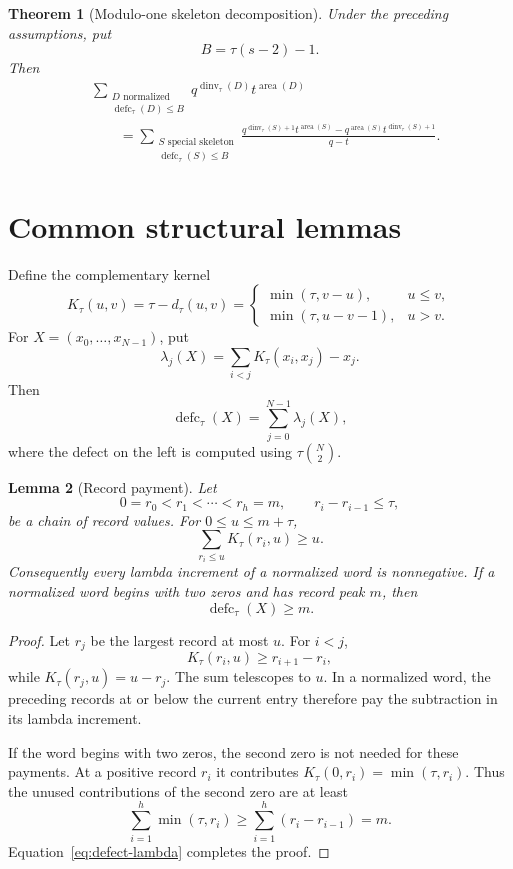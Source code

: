 \documentclass[11pt]{article}
\newtheorem{theorem}{Theorem}[section]
\newtheorem{lemma}[theorem]{Lemma}
\theoremstyle{definition}
\theoremstyle{remark}
\newcommand{\area}{\operatorname{area}}
\newcommand{\dinv}{\operatorname{dinv}}
\newcommand{\defc}{\operatorname{defc}}
\begin{document}
\begin{theorem}[Modulo-one skeleton decomposition]
\label{thm:main}
Under the preceding assumptions, put
\[
  B=\tau(s-2)-1.
\]
Then
\begin{align*}
 &\sum_{\substack{D\text{ normalized}\\\defc_\tau(D)\le B}}
 q^{\dinv_\tau(D)}t^{\area(D)}\\
 &\qquad=
 \sum_{\substack{S\text{ special skeleton}\\\defc_\tau(S)\le B}}
 \frac{
 q^{\dinv_\tau(S)+1}t^{\area(S)}
 -q^{\area(S)}t^{\dinv_\tau(S)+1}
 }{q-t}.
\end{align*}
\end{theorem}

\section{Common structural lemmas}

Define the complementary kernel
\[
 K_\tau(u,v)=\tau-d_\tau(u,v)
 =
 \begin{cases}
   \min(\tau,v-u),&u\le v,\\
   \min(\tau,u-v-1),&u>v.
 \end{cases}
\]
For $X=(x_0,\ldots,x_{N-1})$, put
\[
  \lambda_j(X)=\sum_{i<j}K_\tau(x_i,x_j)-x_j.
\]
Then
\begin{equation}
  \defc_\tau(X)=\sum_{j=0}^{N-1}\lambda_j(X),
  \label{eq:defect-lambda}
\end{equation}
where the defect on the left is computed using
$\tau\binom N2$.

\begin{lemma}[Record payment]
\label{lem:record-payment}
Let
\[
  0=r_0<r_1<\cdots<r_h=m,
  \qquad r_i-r_{i-1}\le\tau,
\]
be a chain of record values.  For $0\le u\le m+\tau$,
\[
  \sum_{r_i\le u}K_\tau(r_i,u)\ge u.
\]
Consequently every lambda increment of a normalized word is nonnegative.
If a normalized word begins with two zeros and has record peak $m$, then
\[
  \defc_\tau(X)\ge m.
\]
\end{lemma}

\begin{proof}
Let $r_j$ be the largest record at most $u$.  For $i<j$,
\[
  K_\tau(r_i,u)\ge r_{i+1}-r_i,
\]
while $K_\tau(r_j,u)=u-r_j$.  The sum telescopes to $u$.  In a normalized
word, the preceding records at or below the current entry therefore pay the
subtraction in its lambda increment.

If the word begins with two zeros, the second zero is not needed for these
payments.  At a positive record $r_i$ it contributes
$K_\tau(0,r_i)=\min(\tau,r_i)$.  Thus the unused contributions of the second
zero are at least
\[
  \sum_{i=1}^h\min(\tau,r_i)
  \ge\sum_{i=1}^h(r_i-r_{i-1})=m.
\]
Equation~\eqref{eq:defect-lambda} completes the proof.
\end{proof}
\end{document}
